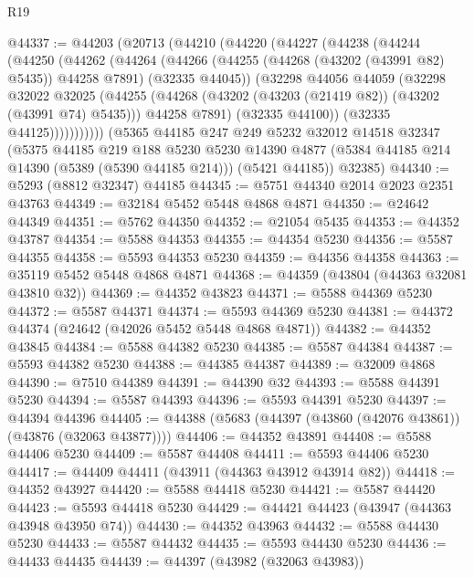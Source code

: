 \begin{lexlean}{R19}
\begin{coremodule}
@44337 := @44203
    (@20713
      (@44210
        (@44220
          (@44227
            (@44238
              (@44244
                (@44250
                  (@44262
                    (@44264
                      (@44266
                        (@44255 (@44268 (@43202 (@43991 @82) @5435)) @44258 @7891)
                        (@32335 @44045))
                      (@32298
                        @44056
                        @44059
                        (@32298
                          @32022
                          @32025
                          (@44255
                            (@44268 (@43202 (@43203 (@21419 @82)) (@43202 (@43991 @74) @5435)))
                            @44258
                            @7891)
                          (@32335 @44100))
                        (@32335 @44125)))))))))))
    (@5365
      @44185
      @247
      @249
      @5232
      @32012
      @14518
      @32347
      (@5375
        @44185
        @219
        @188
        @5230
        @5230
        @14390
        @4877
        (@5384 @44185 @214 @14390 (@5389 (@5390 @44185 @214)))
        (@5421 @44185))
      @32385)
@44340 := @5293 (@8812 @32347) @44185
@44345 := @5751 @44340 @2014 @2023 @2351 @43763
@44349 := @32184 @5452 @5448 @4868 @4871
@44350 := @24642 @44349
@44351 := @5762 @44350
@44352 := @21054 @5435
@44353 := @44352 @43787
@44354 := @5588 @44353
@44355 := @44354 @5230
@44356 := @5587 @44355
@44358 := @5593 @44353 @5230
@44359 := @44356 @44358
@44363 := @35119 @5452 @5448 @4868 @4871
@44368 := @44359 (@43804 (@44363 @32081 @43810 @32))
@44369 := @44352 @43823
@44371 := @5588 @44369 @5230
@44372 := @5587 @44371
@44374 := @5593 @44369 @5230
@44381 := @44372 @44374 (@24642 (@42026 @5452 @5448 @4868 @4871))
@44382 := @44352 @43845
@44384 := @5588 @44382 @5230
@44385 := @5587 @44384
@44387 := @5593 @44382 @5230
@44388 := @44385 @44387
@44389 := @32009 @4868
@44390 := @7510 @44389
@44391 := @44390 @32
@44393 := @5588 @44391 @5230
@44394 := @5587 @44393
@44396 := @5593 @44391 @5230
@44397 := @44394 @44396
@44405 := @44388 (@5683 (@44397 (@43860 (@42076 @43861)) (@43876 (@32063 @43877))))
@44406 := @44352 @43891
@44408 := @5588 @44406 @5230
@44409 := @5587 @44408
@44411 := @5593 @44406 @5230
@44417 := @44409 @44411 (@43911 (@44363 @43912 @43914 @82))
@44418 := @44352 @43927
@44420 := @5588 @44418 @5230
@44421 := @5587 @44420
@44423 := @5593 @44418 @5230
@44429 := @44421 @44423 (@43947 (@44363 @43948 @43950 @74))
@44430 := @44352 @43963
@44432 := @5588 @44430 @5230
@44433 := @5587 @44432
@44435 := @5593 @44430 @5230
@44436 := @44433 @44435
@44439 := @44397 (@43982 (@32063 @43983))

\end{coremodule}
\end{lexlean}
